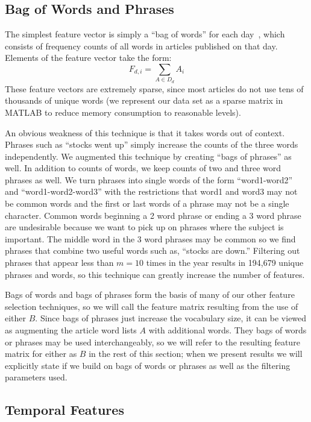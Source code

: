 \documentclass[10pt, twocolumn]{article}
\begin{document}
\subsection{Bag of Words and Phrases}

The simplest feature vector is simply a ``bag of words'' for each day~\cite{featurehash}, which consists of frequency counts of all words in articles published on that day. Elements of the feature vector take the form: $$\displaystyle F_{d,i} = \sum_{A \in D_d}{A_i}$$ These feature vectors are extremely sparse, since most articles do not use tens of thousands of unique words (we represent our data set as a sparse matrix
in MATLAB to reduce memory consumption to reasonable levels).

An obvious weakness of this technique is that it takes words out of context. Phrases such as ``stocks went up'' simply increase the counts of the three words independently. We augmented this technique by creating ``bags of phrases'' as well. In addition to counts of words, we keep counts of two and three word phrases
as well. We turn phrases into single words of the form ``word1-word2'' and ``word1-word2-word3'' with the restrictions that word1 and word3 may not be common words and the first or last words of a phrase may not be a single character. Common words beginning a 2 word phrase or ending a 3 word phrase are undesirable because we want to pick up on phrases where the subject is important. The middle word in the 3 word phrases may be common so we find phrases that combine two useful words such as, ``stocks are down.'' Filtering out phrases that appear less than $m = 10$ times in the year results in 194,679 unique phrases and words, so this technique can greatly increase the number of features.

Bags of words and bags of phrases form the basis of many of our other feature selection techniques, so we will call the feature matrix resulting from the use of either $B$. Since bags of phrases just increase the vocabulary size, it can be viewed as augmenting the article word lists $A$ with additional words. They bags of words or phrases may be used interchangeably, so we will refer to the resulting feature matrix for either as $B$ in the rest of this section; when we present results we will explicitly state if we build on bags of words or phrases as well as the filtering parameters used.

\subsection{Temporal Features}
\end{document}
